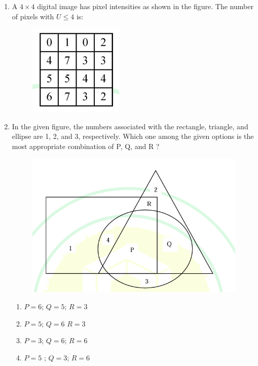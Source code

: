 \documentclass[journal,12pt,onecolumn]{IEEEtran}
\theoremstyle{remark}
\begin{document}
\begin{enumerate}
\item A $4 \times 4$ digital image has pixel intensities  as shown in the figure. The number of pixels with $U \leq 4$ is:
    \begin{figure}[H]
        \centering
        \includegraphics[width=0.2\columnwidth]{figs/q3.png}
        \caption*{}
        \label{fig:placeholder}
    \end{figure}
    \begin{enumerate}
    \end{enumerate}     
    \hfill{}





\item In the given figure, the numbers associated with the rectangle, triangle, and ellipse are 1, 2, and 3, respectively. Which one among the given options is the most appropriate combination of P, Q, and R ?
    \begin{figure}[H]
        \centering
        \includegraphics[width=0.4\columnwidth]{figs/q4.png}
        \caption*{}
        \label{fig:placeholder}
    \end{figure}
    \begin{enumerate}
        \item $P=6$; $Q=5$; $R=3$
        \item $P=5$; $Q=6$ $R=3$
        \item $P=3$; $Q=6$; $R=6$
        \item $P=5$ ; $Q=3$; $R=6$
    \end{enumerate}     
     \hfill{}





\end{enumerate}
\end{document}
